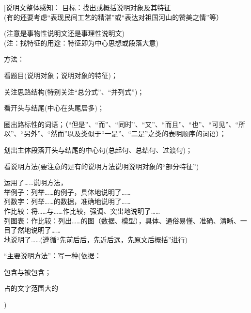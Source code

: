 \hatsubsection[\hatm[调整顺序]{3}{2011-07-17}]{说明文整体感知：}
目标：找出或概括说明对象及其特征\\
(有的还要考虑``表现民间工艺的精湛''或``表达对祖国河山的赞美之情''等）\par
(注意是事物性说明文还是事理性说明文)\\
(注：找特征的用途：特征即为中心思想或段落大意)\par
方法：\begin{asparaenum}[(1)]\item 看题目(说明对象；说明对象的特征)；
        \item 关注思路结构(特别关注``总分式''、``并列式'')；
        \item 看开头与结尾(中心在头尾居多)；
        \item 圈出路标性的词语；（``但是''、``而''、``同时''、``又''、``而且''、``也''、``可见''、``所以''、``另外''、``然而''以及类似于``一是''、``二是''之类的表明顺序的词语）；
        \item 划出主体段落开头与结尾的中心句(总起句、总结句、过渡句)；
        \item 看说明方法(要注意的是有的说明方法说明说明对象的``部分特征'')\end{asparaenum}

运用了\ldots{}\ldots{}说明方法，\\
举例子：列举\ldots{}\ldots{}的例子，具体地说明了\ldots{}\ldots{}\\
列数字：列举\ldots{}\ldots{}的数据，准确地说明了\ldots{}\ldots{}\\
作比较：将\ldots{}\ldots{}与\ldots{}\ldots{}作比较，强调、突出地说明了\ldots{}\ldots{}\\
列图表：作比较：列出\ldots{}\ldots{}的图（数据、模型），具体、通俗易懂、准确、清晰、一目了然地说明了\ldots{}\ldots{}\\
地说明了\ldots{}\ldots{}(遵循``先前后后，先近后远，先原文后概括''进行)\par
``主要说明方法''：写一种(依据：\begin{inparaenum}[(1)]\item 包含与被包含；\item 占的文字范围大的\end{inparaenum})\\

